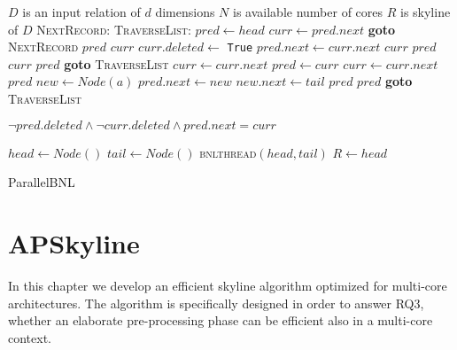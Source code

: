 \documentclass[12pt,a4paper,twoside]{report}
\begin{document}
\begin{algorithm}[H]
	\begin{algorithmic}
		\Require
			$D$ is an input relation of $d$ dimensions
			$N$ is available number of cores
		\Ensure $R$ is skyline of $D$
			\State \textsc{NextRecord:}
				\State \textsc{TraverseList:}
				\State $pred \leftarrow head$
				\State $curr \leftarrow pred.next$
						\State \textbf{goto} \textsc{NextRecord}
						\State \Lock $pred$
						\State \Lock $curr$
							\State $curr.deleted \leftarrow$ \texttt{True}
							\State $pred.next \leftarrow curr.next$
							\State \Unlock $curr$
							\State \Unlock $pred$
						\Else
							\State \Unlock $curr$
							\State \Unlock $pred$
							\State \textbf{goto} \textsc{TraverseList}
						\EndIf
						\State $curr \leftarrow curr.next$
					\Else
						\State $pred \leftarrow curr$
						\State $curr \leftarrow curr.next$
					\EndIf
				\EndWhile
				\State \Lock $pred$
					\State $new \leftarrow Node(a)$
					\State $pred.next \leftarrow new$
					\State $new.next \leftarrow tail$
					\State \Unlock $pred$
				\Else
					\State \Unlock $pred$
					\State \textbf{goto} \textsc{TraverseList}
				\EndIf
			\EndWhile
		\EndFunction

			\State \Return $\lnot pred.deleted \land \lnot curr.deleted \land pred.next = curr$
		\EndFunction

		\State $head \leftarrow Node()$
		\State $tail \leftarrow Node()$
			\State \textsc{bnlthread}$(head,tail)$
		\EndForAllP
		\State $R \leftarrow head$
	\end{algorithmic}
	\caption{ParallelBNL}
	\label{alg:parallel-bnl}
\end{algorithm}

\cleardoublepage
\chapter{APSkyline}
\label{chap:apskyline}

In this chapter we develop an efficient skyline algorithm
optimized for multi-core architectures. The algorithm is
specifically designed in order to answer RQ3, whether an
elaborate pre-processing phase can be efficient also in a
multi-core context.
\end{document}
